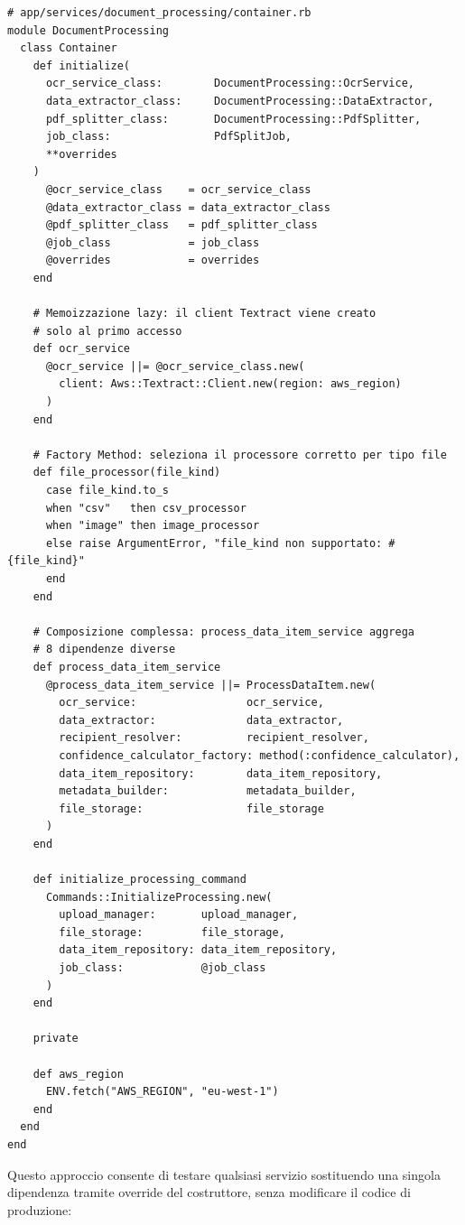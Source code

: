 \documentclass[a4paper,11pt]{article}
\begin{document}
\begin{lstlisting}[caption={DocumentProcessing::Container -- composizione delle dipendenze}]
# app/services/document_processing/container.rb
module DocumentProcessing
  class Container
    def initialize(
      ocr_service_class:        DocumentProcessing::OcrService,
      data_extractor_class:     DocumentProcessing::DataExtractor,
      pdf_splitter_class:       DocumentProcessing::PdfSplitter,
      job_class:                PdfSplitJob,
      **overrides
    )
      @ocr_service_class    = ocr_service_class
      @data_extractor_class = data_extractor_class
      @pdf_splitter_class   = pdf_splitter_class
      @job_class            = job_class
      @overrides            = overrides
    end

    # Memoizzazione lazy: il client Textract viene creato
    # solo al primo accesso
    def ocr_service
      @ocr_service ||= @ocr_service_class.new(
        client: Aws::Textract::Client.new(region: aws_region)
      )
    end

    # Factory Method: seleziona il processore corretto per tipo file
    def file_processor(file_kind)
      case file_kind.to_s
      when "csv"   then csv_processor
      when "image" then image_processor
      else raise ArgumentError, "file_kind non supportato: #{file_kind}"
      end
    end

    # Composizione complessa: process_data_item_service aggrega
    # 8 dipendenze diverse
    def process_data_item_service
      @process_data_item_service ||= ProcessDataItem.new(
        ocr_service:                 ocr_service,
        data_extractor:              data_extractor,
        recipient_resolver:          recipient_resolver,
        confidence_calculator_factory: method(:confidence_calculator),
        data_item_repository:        data_item_repository,
        metadata_builder:            metadata_builder,
        file_storage:                file_storage
      )
    end

    def initialize_processing_command
      Commands::InitializeProcessing.new(
        upload_manager:       upload_manager,
        file_storage:         file_storage,
        data_item_repository: data_item_repository,
        job_class:            @job_class
      )
    end

    private

    def aws_region
      ENV.fetch("AWS_REGION", "eu-west-1")
    end
  end
end
\end{lstlisting}

Questo approccio consente di testare qualsiasi servizio sostituendo una
singola dipendenza tramite override del costruttore, senza modificare il
codice di produzione:
\end{document}
